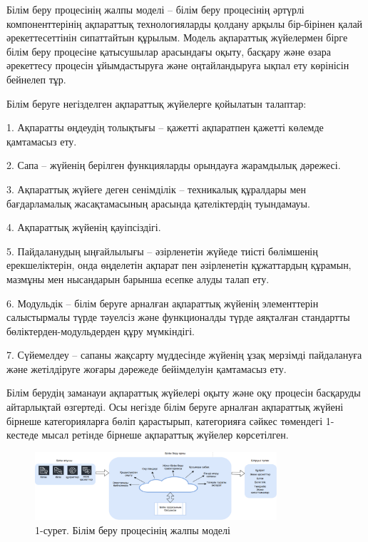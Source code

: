 \begin{multicols}{2}
Білім беру процесінің жалпы моделі -- білім беру процесінің әртүрлі
компоненттерінің ақпараттық технологияларды қолдану арқылы бір-бірінен
қалай әрекеттесеттінін сипаттайтын құрылым. Модель ақпараттық жүйелермен
бірге білім беру процесіне қатысушылар арасындағы оқыту, басқару және
өзара әрекеттесу процесін ұйымдастыруға және оңтайландыруға ықпал ету
көрінісін бейнелеп тұр.

Білім беруге негізделген ақпараттық жүйелерге қойылатын талаптар:

1. Ақпаратты өңдеудің толықтығы -- қажетті ақпаратпен қажетті көлемде
қамтамасыз ету.

2. Сапа -- жүйенің берілген функцияларды орындауға жарамдылық дәрежесі.

3. Ақпараттық жүйеге деген сенімділік -- техникалық құралдары мен
бағдарламалық жасақтамасының арасында қателіктердің туындамауы.

4. Ақпараттық жүйенің қауіпсіздігі.

5. Пайдаланудың ыңғайлылығы -- әзірленетін жүйеде тиісті бөлімшенің
ерекшеліктерін, онда өңделетін ақпарат пен әзірленетін құжаттардың
құрамын, мазмұны мен нысандарын барынша есепке алуды талап ету.

6. Модульдік -- білім беруге арналған ақпараттық жүйенің элементтерін
салыстырмалы түрде тәуелсіз және функционалды түрде аяқталған
стандартты бөліктерден-модульдерден құру мүмкіндігі.

7. Сүйемелдеу -- сапаны жақсарту мүддесінде жүйенің ұзақ мерзімді
пайдалануға және жетілдіруге жоғары дәрежеде бейімделуін қамтамасыз
ету.

Білім берудің заманауи ақпараттық жүйелері оқыту және оқу процесін
басқаруды айтарлықтай өзгертеді. Осы негізде білім беруге арналған
ақпараттық жүйені бірнеше категорияларға бөліп қарастырып, категорияға
сәйкес төмендегі 1-кестеде мысал ретінде бірнеше ақпараттық жүйелер
көрсетілген.
\end{multicols}

\begin{figure}[H]
	\centering
	\includegraphics[width=0.8\textwidth]{media/ict/image99}
	\caption*{1-сурет. Білім беру процесінің жалпы моделі}
\end{figure}


